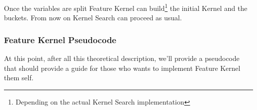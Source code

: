 Once the variables are split Feature Kernel can build\footnote{Depending on the actual Kernel Search implementation} the initial Kernel and the buckets. From now on Kernel Search can 
proceed as usual. 


\subsubsection{Feature Kernel Pseudocode}
At this point, after all this theoretical description, we'll provide a pseudocode that should provide a guide for those who wants to implement Feature Kernel them self.





